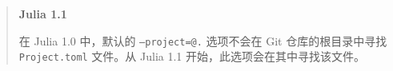



\begin{quote}
\textbf{Julia 1.1}

在 Julia 1.0 中，默认的 \texttt{--project=@.} 选项不会在 Git 仓库的根目录中寻找 \texttt{Project.toml} 文件。从 Julia 1.1 开始，此选项会在其中寻找该文件。

\end{quote}


